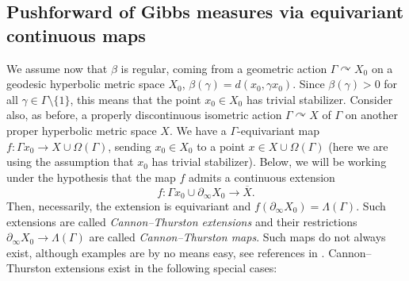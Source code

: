 \documentclass[12pt]{amsbook}%
\theoremstyle{definition}
\theoremstyle{remark}
\numberwithin{section}{chapter}
\numberwithin{subsection}{section}
\numberwithin{figure}{chapter}
\DeclareMathOperator{\acts}{\curvearrowright}
\def\Ga{\Gamma}
\def\ga{\gamma}
\def\La{\Lambda}
\def\geo{\partial_\infty}
\begin{document}
{{\subsection{Pushforward of Gibbs measures via equivariant continuous maps}\label{sec:CT}



We assume now that $\beta$ is regular, coming from a geometric action $\Ga\acts X_0$ on a geodesic hyperbolic metric space $X_0$, 
$\beta(\ga)= d(x_0, \ga x_0)$. Since $\beta(\gamma)>0$ for all $\gamma\in \Gamma \setminus \{1\}$, this means that the point 
$x_0\in X_0$ has trivial stabilizer.  Consider also, as before, a properly discontinuous isometric action $\Ga\acts X$ of $\Ga$ on another proper 
hyperbolic metric space $X$. 
We have a $\Ga$-equivariant map $f: \Gamma x_0\to X\cup \Omega(\Ga)$, sending $x_0\in X_0$ to a point 
$x\in X\cup \Omega(\Ga)$ (here we are using the assumption that $x_0$ has trivial stabilizer). Below, we will be working under the hypothesis that the map $f$ admits a continuous extension 
$$
f: \Gamma x_0 \cup \geo X_0\to \overline{X}. 
$$ 
Then, necessarily, the extension is equivariant and $f(\geo X_0)= \Lambda(\Ga)$. Such extensions are called {\em Cannon--Thurston extensions} 
and their restrictions $\geo X_0\to \La(\Ga)$ are called  {\em Cannon--Thurston maps}. 
Such maps  
 do not always exist, although examples are by no means easy, see references in \cite{Mj}. Cannon--Thurston  extensions exist in the following special cases:

}}
\end{document}
